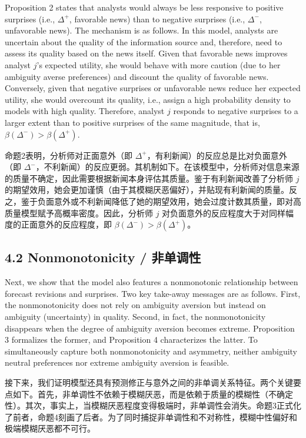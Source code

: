 \documentclass[12pt,a4paper]{article}
\newenvironment{original}
  {\par\medskip\noindent\ignorespaces}
  {\par\medskip}
\newenvironment{translation}
  {\par\noindent{\color{transblue}\ignorespaces}}
  {\par\bigskip}
\begin{document}
\begin{original}
Proposition 2 states that analysts would always be less responsive to positive surprises (i.e., $\Delta^+$, favorable news) than to negative surprises (i.e., $\Delta^-$, unfavorable news). The mechanism is as follows. In this model, analysts are uncertain about the quality of the information source and, therefore, need to assess its quality based on the news itself. Given that favorable news improves analyst $j$'s expected utility, she would behave with more caution (due to her ambiguity averse preferences) and discount the quality of favorable news. Conversely, given that negative surprises or unfavorable news reduce her expected utility, she would overcount its quality, i.e., assign a high probability density to models with high quality. Therefore, analyst $j$ responds to negative surprises to a larger extent than to positive surprises of the same magnitude, that is, $\beta(\Delta^-) > \beta(\Delta^+)$.
\end{original}
\begin{translation}
命题2表明，分析师对正面意外（即 $\Delta^+$，有利新闻）的反应总是比对负面意外（即 $\Delta^-$，不利新闻）的反应更弱。其机制如下。在该模型中，分析师对信息来源的质量不确定，因此需要根据新闻本身评估其质量。鉴于有利新闻改善了分析师 $j$ 的期望效用，她会更加谨慎（由于其模糊厌恶偏好），并贴现有利新闻的质量。反之，鉴于负面意外或不利新闻降低了她的期望效用，她会过度计数其质量，即对高质量模型赋予高概率密度。因此，分析师 $j$ 对负面意外的反应程度大于对同样幅度的正面意外的反应程度，即 $\beta(\Delta^-) > \beta(\Delta^+)$。
\end{translation}

\subsection{4.2 Nonmonotonicity / 非单调性}

\begin{original}
Next, we show that the model also features a nonmonotonic relationship between forecast revisions and surprises. Two key take-away messages are as follows. First, the nonmonotonicity does not rely on ambiguity aversion but instead on ambiguity (uncertainty) in quality. Second, in fact, the nonmonotonicity disappears when the degree of ambiguity aversion becomes extreme. Proposition 3 formalizes the former, and Proposition 4 characterizes the latter. To simultaneously capture both nonmonotonicity and asymmetry, neither ambiguity neutral preferences nor extreme ambiguity aversion is feasible.
\end{original}
\begin{translation}
接下来，我们证明模型还具有预测修正与意外之间的非单调关系特征。两个关键要点如下。首先，非单调性不依赖于模糊厌恶，而是依赖于质量的模糊性（不确定性）。其次，事实上，当模糊厌恶程度变得极端时，非单调性会消失。命题3正式化了前者，命题4刻画了后者。为了同时捕捉非单调性和不对称性，模糊中性偏好和极端模糊厌恶都不可行。
\end{translation}
\end{document}
